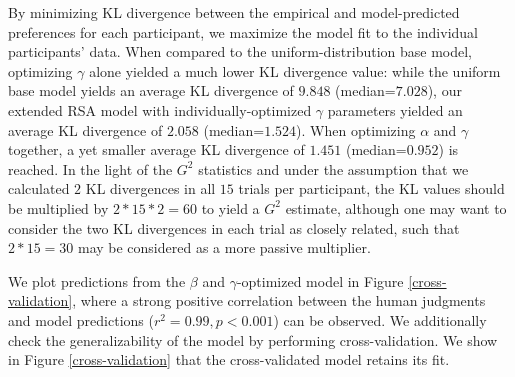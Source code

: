 \documentclass[10pt,a4paper]{article}
\begin{document}
By minimizing KL divergence between the empirical and model-predicted preferences for each participant, we maximize the model fit to the individual participants' data.
When compared to the uniform-distribution base model, optimizing $\gamma$ alone yielded a much lower KL divergence value: while the uniform base model yields an average KL divergence of $9.848$ (median=$7.028$), our extended RSA model with individually-optimized $\gamma$ parameters yielded an average KL divergence of $2.058$ (median=$1.524$). 
When optimizing $\alpha$ and $\gamma$ together, a yet smaller average KL divergence of $1.451$ (median=$0.952$) is reached.
In the light of the $G^2$ statistics and under the assumption that we calculated $2$ KL divergences in all $15$ trials per participant, the KL values should be multiplied by $2*15*2=60$ to yield a $G^2$ estimate, although one may want to consider the two KL divergences in each trial as closely related, such that $2*15=30$ may be considered as a more passive multiplier.



 

We plot predictions from the $\beta$ and $\gamma$-optimized model in Figure \ref{cross-validation}, where a strong positive correlation between the human judgments and model predictions ($r^2 = 0.99, p < 0.001$) can be observed. We additionally check the generalizability of the model by performing cross-validation. We show in Figure \ref{cross-validation} that the cross-validated model retains its fit.
\end{document}
